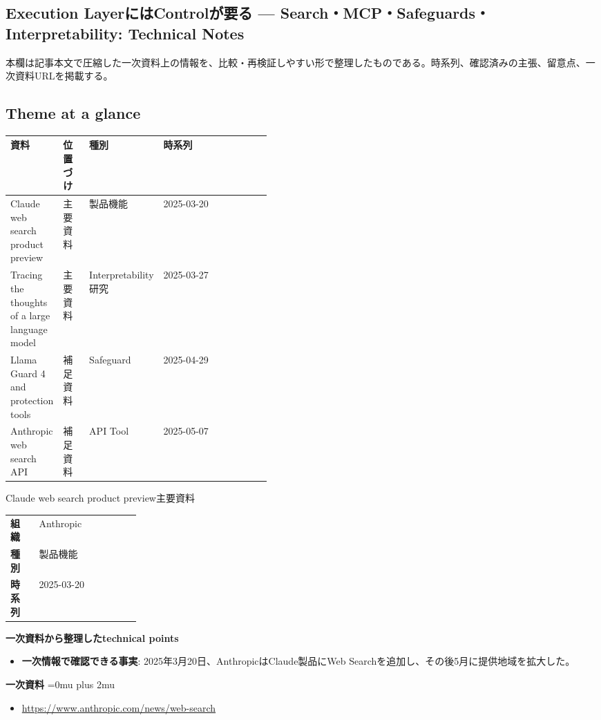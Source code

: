 \subsection*{Execution LayerにはControlが要る — Search・MCP・Safeguards・Interpretability: Technical Notes}
本欄は記事本文で圧縮した一次資料上の情報を、比較・再検証しやすい形で整理したものである。時系列、確認済みの主張、留意点、一次資料URLを掲載する。
\medskip
\subsection*{Theme at a glance}
\begin{center}
\footnotesize
\begin{tabularx}{\linewidth}{@{}p{0.20\linewidth}p{0.10\linewidth}p{0.14\linewidth}X@{}}
\toprule
資料 & 位置づけ & 種別 & 時系列 \\
\midrule
Claude web search product preview & 主要資料 & 製品機能 & 2025-03-20   \\
Tracing the thoughts of a large language model & 主要資料 & Interpretability研究 & 2025-03-27   \\
Llama Guard 4 and protection tools & 補足資料 & Safeguard & 2025-04-29   \\
Anthropic web search API & 補足資料 & API Tool & 2025-05-07   \\
\bottomrule
\end{tabularx}
\end{center}
\normalsize

\begin{technicalnote}{Claude web search product preview}{主要資料}
\begingroup
\begin{tabularx}{\linewidth}{@{}>{\bfseries}p{0.22\linewidth}X@{}}
組織 & Anthropic \\
種別 & 製品機能 \\
時系列 & 2025-03-20 \\
\end{tabularx}
\smallskip
\begin{minipage}{\linewidth}
{\bfseries 一次資料から整理したtechnical points}
\begin{itemize}[leftmargin=1.5em,itemsep=0.35em]
\item \textbf{一次情報で確認できる事実}: 2025年3月20日、AnthropicはClaude製品にWeb Searchを追加し、その後5月に提供地域を拡大した。
\end{itemize}
\begin{samepage}
{\bfseries 一次資料}
\begingroup\sloppy
\Urlmuskip=0mu plus 2mu\relax
\begin{itemize}[leftmargin=1.5em,itemsep=0.25em]
\item {\scriptsize\url{https://www.anthropic.com/news/web-search}}
\end{itemize}
\endgroup
\end{samepage}
\end{minipage}
\endgroup
\end{technicalnote}
\medskip

